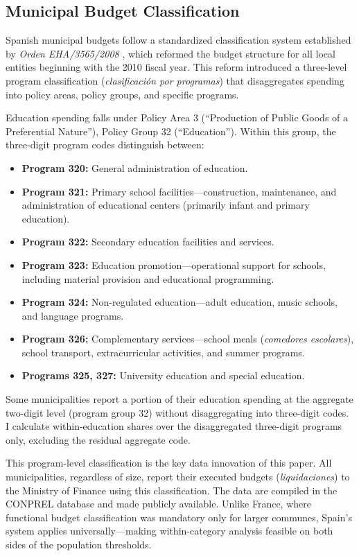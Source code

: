 \documentclass[12pt]{article}
\begin{document}
\subsection{Municipal Budget Classification}

Spanish municipal budgets follow a standardized classification system established by \emph{Orden EHA/3565/2008} \citep{orden2008}, which reformed the budget structure for all local entities beginning with the 2010 fiscal year. This reform introduced a three-level program classification (\emph{clasificaci\'{o}n por programas}) that disaggregates spending into policy areas, policy groups, and specific programs.

Education spending falls under Policy Area 3 (``Production of Public Goods of a Preferential Nature''), Policy Group 32 (``Education''). Within this group, the three-digit program codes distinguish between:

\begin{itemize}
    \item \textbf{Program 320:} General administration of education.
    \item \textbf{Program 321:} Primary school facilities---construction, maintenance, and administration of educational centers (primarily infant and primary education).
    \item \textbf{Program 322:} Secondary education facilities and services.
    \item \textbf{Program 323:} Education promotion---operational support for schools, including material provision and educational programming.
    \item \textbf{Program 324:} Non-regulated education---adult education, music schools, and language programs.
    \item \textbf{Program 326:} Complementary services---school meals (\emph{comedores escolares}), school transport, extracurricular activities, and summer programs.
    \item \textbf{Programs 325, 327:} University education and special education.
\end{itemize}

Some municipalities report a portion of their education spending at the aggregate two-digit level (program group 32) without disaggregating into three-digit codes. I calculate within-education shares over the disaggregated three-digit programs only, excluding the residual aggregate code.

This program-level classification is the key data innovation of this paper. All municipalities, regardless of size, report their executed budgets (\emph{liquidaciones}) to the Ministry of Finance using this classification. The data are compiled in the CONPREL database and made publicly available. Unlike France, where functional budget classification was mandatory only for larger communes, Spain's system applies universally---making within-category analysis feasible on both sides of the population thresholds.
\end{document}
